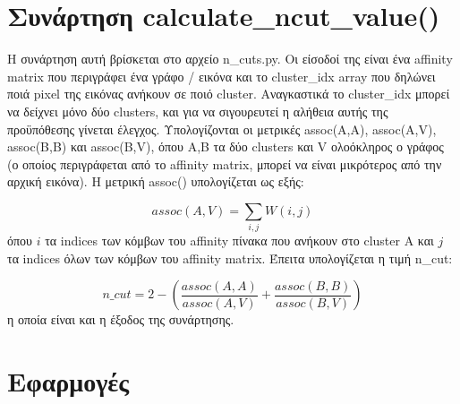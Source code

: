 \documentclass{article}
\begin{document}
\section{Συνάρτηση calculate\_ncut\_value()}
Η συνάρτηση αυτή βρίσκεται στο αρχείο n\_cuts.py. Οι είσοδοί της είναι ένα 
affinity matrix που περιγράφει ένα γράφο / εικόνα και το cluster\_idx array 
που δηλώνει ποιά pixel της εικόνας ανήκουν σε ποιό cluster. Αναγκαστικά το
cluster\_idx μπορεί να δείχνει μόνο δύο clusters, και για να σιγουρευτεί η
αλήθεια αυτής της προϋπόθεσης γίνεται έλεγχος. Υπολογίζονται οι 
μετρικές assoc(A,A), assoc(A,V), assoc(B,B) και assoc(B,V), όπου A,B τα δύο
clusters και V ολοόκληρος ο γράφος (ο οποίος περιγράφεται από το affinity
matrix, μπορεί να είναι μικρότερος από την αρχική εικόνα). Η μετρική assoc()
υπολογίζεται ως εξής:

\begin{equation}
    assoc(A,V) = \sum_{i, j} W(i, j)
\end{equation}
όπου $i$ τα indices των κόμβων του affinity πίνακα που ανήκουν στο cluster A
και $j$ τα indices όλων των κόμβων του affinity matrix. Έπειτα υπολογίζεται η 
τιμή n\_cut:

\begin{equation}
    n\_cut = 2 - \left(\frac{assoc(A,A)}{assoc(A,V)} + \frac{assoc(B,B)}{assoc(B,V)}\right)
\end{equation}
η οποία είναι και η έξοδος της συνάρτησης.

\section{Εφαρμογές}
\end{document}

